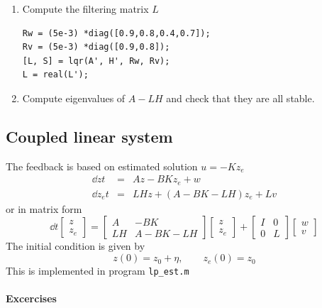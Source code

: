 \documentclass[12pt]{article}
\begin{document}
\begin{enumerate}

\item Compute the filtering matrix $L$
\begin{lstlisting}
Rw = (5e-3) *diag([0.9,0.8,0.4,0.7]);
Rv = (5e-3) *diag([0.9,0.8]);
[L, S] = lqr(A', H', Rw, Rv);
L = real(L');
\end{lstlisting}

\item Compute eigenvalues of $A-LH$ and check that they are all stable.

\end{enumerate}

\subsection{Coupled linear system}
The feedback is based on estimated solution $u = -K z_e$
\begin{eqnarray*}
\dd{z}{t} &=& A z - B K z_e + w \\
\dd{z_e}{t} &=& L H z + (A - B K - L H) z_e + L v
\end{eqnarray*}
or in matrix form
\[
\dd{}{t} \begin{bmatrix}
z \\
z_e \end{bmatrix} = \begin{bmatrix}
A & -B K \\
L H & A - B K - L H \end{bmatrix} \begin{bmatrix}
z \\ z_e \end{bmatrix} + \begin{bmatrix}
I & 0 \\
0 & L \end{bmatrix} \begin{bmatrix}
w \\ v \end{bmatrix}
\]
The initial condition is given by
\[
z(0) = z_0 + \eta, \qquad z_e(0) = z_0
\]
This is implemented in program {\tt lp\_est.m}

\paragraph{Excercises}
\end{document}
